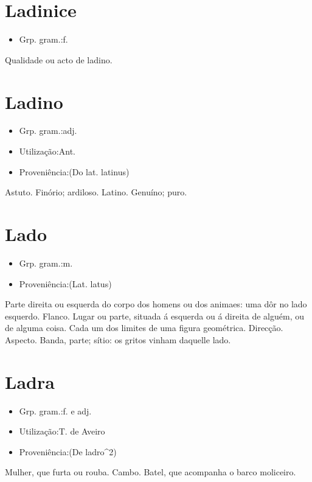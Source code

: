 \section{Ladinice}
\begin{itemize}
\item {Grp. gram.:f.}
\end{itemize}
Qualidade ou acto de ladino.
\section{Ladino}
\begin{itemize}
\item {Grp. gram.:adj.}
\end{itemize}
\begin{itemize}
\item {Utilização:Ant.}
\end{itemize}
\begin{itemize}
\item {Proveniência:(Do lat. \textunderscore latinus\textunderscore )}
\end{itemize}
Astuto.
Finório; ardiloso.
Latino.
Genuíno; puro.
\section{Lado}
\begin{itemize}
\item {Grp. gram.:m.}
\end{itemize}
\begin{itemize}
\item {Proveniência:(Lat. \textunderscore latus\textunderscore )}
\end{itemize}
Parte direita ou esquerda do corpo dos homens ou dos animaes: \textunderscore uma dôr no lado esquerdo\textunderscore .
Flanco.
Lugar ou parte, situada á esquerda ou á direita de alguém, ou de alguma coisa.
Cada um dos limites de uma figura geométrica.
Direcção.
Aspecto.
Banda, parte; sítio: \textunderscore os gritos vinham daquelle lado\textunderscore .
\section{Ladra}
\begin{itemize}
\item {Grp. gram.:f.  e  adj.}
\end{itemize}
\begin{itemize}
\item {Utilização:T. de Aveiro}
\end{itemize}
\begin{itemize}
\item {Proveniência:(De \textunderscore ladro\textunderscore ^2)}
\end{itemize}
Mulher, que furta ou rouba.
Cambo.
Batel, que acompanha o barco moliceiro.
